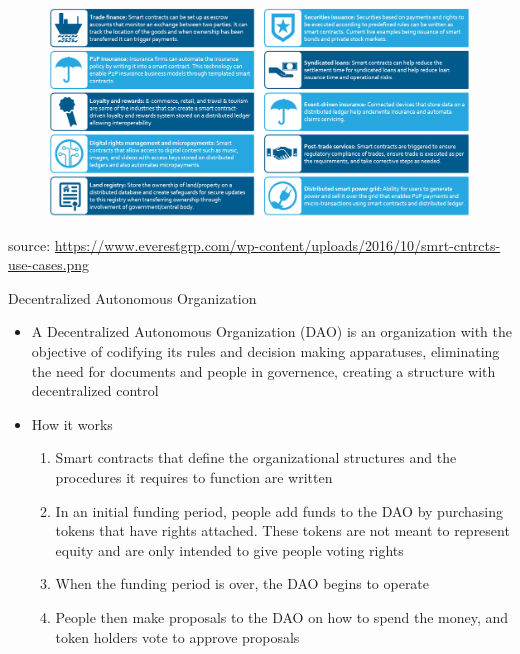 \documentclass[11pt]{beamer}
\begin{document}

\begin{frame}{}
	\begin{figure}[]
		\centering
		\includegraphics  [scale=0.45]{Images/smart-use}
	\end{figure}
	\begin{scriptsize}
		source: \href{https://www.everestgrp.com/2016-10-smart-contracts-use-cases-market-insights-36265.html/}{https://www.everestgrp.com/wp-content/uploads/2016/10/smrt-cntrcts-use-cases.png}
	\end{scriptsize}
\end{frame}


\begin{frame}{Decentralized Autonomous Organization}
	\begin{itemize}
		\item A Decentralized Autonomous Organization (DAO) is an organization with the objective of codifying its rules and decision making apparatuses, eliminating the need for documents and people in governence, creating a structure with decentralized control
		\item How it works
		\begin{enumerate}
			\item Smart contracts that define the organizational structures and the procedures it requires to function are written
			\item In an initial funding period, people add funds to the DAO by purchasing tokens that have rights attached. These tokens are not meant to represent equity and are only intended to give people voting rights
			\item When the funding period is over, the DAO begins to operate
			\item People then  make proposals to the DAO on how to spend the money, and token holders vote to approve proposals
		\end{enumerate}
	\end{itemize}
\end{frame}
\end{document}
